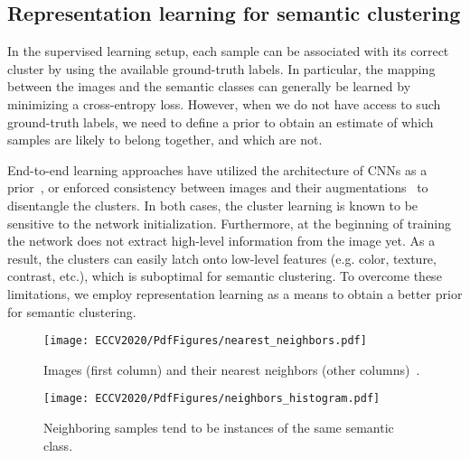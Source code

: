 \documentclass[runningheads]{llncs}
\begin{document}
\subsection{Representation learning for semantic clustering}
\label{subsec: method_neighbors}
In the supervised learning setup, each sample can be associated with its correct cluster by using the available ground-truth labels. In particular, the mapping between the images  and the semantic classes  can generally be learned by minimizing a cross-entropy loss. However, when we do not have access to such ground-truth labels, we need to define a prior to obtain an estimate of which samples are likely to belong together, and which are not. 

End-to-end learning approaches have utilized the architecture of CNNs as a prior~\cite{yang2016joint,DAC,DEC,haeusser2018associative,DeepCluster,DeeperCluster}, or enforced consistency between images and their augmentations~\cite{IIC,hu2017learning} to disentangle the clusters. In both cases, the cluster learning is known to be sensitive to the network initialization. Furthermore, at the beginning of training the network does not extract high-level information from the image yet. As a result, the clusters can easily latch onto low-level features (e.g. color, texture, contrast, etc.), which is suboptimal for semantic clustering. To overcome these limitations, we employ representation learning as a means to obtain a better prior for semantic clustering.

\begin{figure}[t]
\begin{minipage}[t]{.50\linewidth} \centering
\texttt{[image: ECCV2020/PdfFigures/nearest\_neighbors.pdf]}
\caption{Images (first column) and their nearest neighbors (other columns)~\cite{wu2018unsupervised}.}
\label{fig: neighbors_examples}
\end{minipage} \hspace*{\fill}
\begin{minipage}[t]{.48\linewidth} \centering
\texttt{[image: ECCV2020/PdfFigures/neighbors\_histogram.pdf]}
\caption{Neighboring samples tend to be instances of the same semantic class.}
\label{fig: neighbors_histogram}
\end{minipage} \end{figure}
\end{document}
